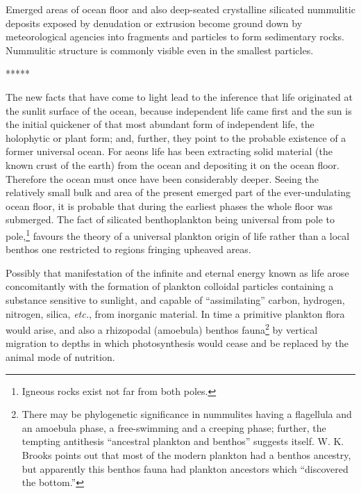 \documentclass[a4paper, 12pt, oneside]{article}
\begin{document}
Emerged areas of ocean floor and also deep-seated crystalline silicated nummulitic deposits exposed by denudation or extrusion become ground down by meteorological agencies into fragments and particles to form sedimentary rocks. Nummulitic structure is commonly visible even in the smallest particles.

\centerline{*\hspace{15mm}*\hspace{15mm}*\hspace{15mm}*\hspace{15mm}*}
\bigskip

The new facts that have come to light lead to the inference that life originated at the sunlit surface of the ocean, because independent life came first and the sun is the initial quickener of that most abundant form of independent life, the holophytic or plant form; and, further, they point to the probable existence of a former universal ocean. For aeons life has been extracting solid material (the known crust of the earth) from the ocean and depositing it on the ocean floor. Therefore the ocean must once have been considerably deeper. Seeing the relatively small bulk and area of the present emerged part of the ever-undulating ocean floor, it is probable that during the earliest phases the whole floor was submerged. The fact of silicated benthoplankton being universal from pole to pole,\footnote{Igneous rocks exist not far from both poles.} favours the theory of a universal plankton origin of life rather than a local benthos one restricted to regions fringing upheaved areas.

Possibly that manifestation of the infinite and eternal energy known as life arose concomitantly with the formation of plankton colloidal particles containing a substance sensitive to sunlight, and capable of ``assimilating'' carbon, hydrogen, nitrogen, silica, \emph{etc.}, from inorganic material. In time a primitive plankton flora would arise, and also a rhizopodal (amoebula) benthos fauna\footnote{There may be phylogenetic significance in nummulites having a flagellula and an amoebula phase, a free-swimming and a creeping phase; further, the tempting antithesis ``ancestral plankton and benthos'' suggests itself. W. K. Brooks points out that most of the modern plankton had a benthos ancestry, but apparently this benthos fauna had plankton ancestors which ``discovered the bottom.''} by vertical migration to depths in which photosynthesis would cease and be replaced by the animal mode of nutrition.
\end{document}
